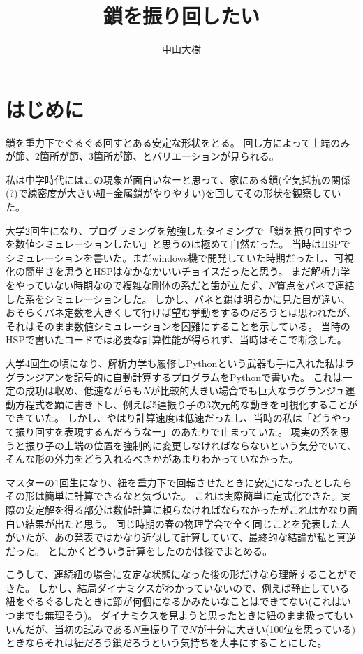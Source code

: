 \documentclass{jsarticle}
\title{鎖を振り回したい}
\author{中山大樹}
\begin{document}
\maketitle

\part{はじめに}

鎖を重力下でぐるぐる回すとある安定な形状をとる。
回し方によって上端のみが節、2箇所が節、3箇所が節、とバリエーションが見られる。

私は中学時代にはこの現象が面白いなーと思って、家にある鎖(空気抵抗の関係(?)で線密度が大きい紐=金属鎖がやりやすい)を回してその形状を観察していた。

大学2回生になり、プログラミングを勉強したタイミングで「鎖を振り回すやつを数値シミュレーションしたい」と思うのは極めて自然だった。
当時はHSPでシミュレーションを書いた。まだwindows機で開発していた時期だったし、可視化の簡単さを思うとHSPはなかなかいいチョイスだったと思う。
まだ解析力学をやっていない時期なので複雑な剛体の系だと歯が立たず、$N$質点をバネで連結した系をシミュレーションした。
しかし、バネと鎖は明らかに見た目が違い、おそらくバネ定数を大きくして行けば望む挙動をするのだろうとは思われたが、それはそのまま数値シミュレーションを困難にすることを示している。
当時のHSPで書いたコードでは必要な計算性能が得られず、当時はそこで断念した。

大学4回生の頃になり、解析力学も履修しPythonという武器も手に入れた私はラグランジアンを記号的に自動計算するプログラムをPythonで書いた。
これは一定の成功は収め、低速ながらも$N$が比較的大きい場合でも巨大なラグランジュ運動方程式を顕に書き下し、例えば5連振り子の3次元的な動きを可視化することができていた。
しかし、やはり計算速度は低速だったし、当時の私は「どうやって振り回すを表現するんだろうなー」のあたりで止まっていた。
現実の系を思うと振り子の上端の位置を強制的に変更しなければならないという気分でいて、そんな形の外力をどう入れるべきかがあまりわかっていなかった。

マスターの1回生になり、紐を重力下で回転させたときに安定になったとしたらその形は簡単に計算できるなと気づいた。
これは実際簡単に定式化できた。実際の安定解を得る部分は数値計算に頼らなければならなかったがこれはかなり面白い結果が出たと思う。
同じ時期の春の物理学会で全く同じことを発表した人がいたが、あの発表ではかなり近似して計算していて、最終的な結論が私と真逆だった。
とにかくどういう計算をしたのかは後でまとめる。

こうして、連続紐の場合に安定な状態になった後の形だけなら理解することができた。
しかし、結局ダイナミクスがわかっていないので、例えば静止している紐をぐるぐるしたときに節が何個になるかみたいなことはできてない(これはいつまでも無理そう)。
ダイナミクスを見ようと思ったときに紐のまま扱ってもいいんだが、当初の試みである$N$重振り子で$N$が十分に大きい(100位を思っている)ときならそれは紐だろう鎖だろうという気持ちを大事にすることにした。
\end{document}
